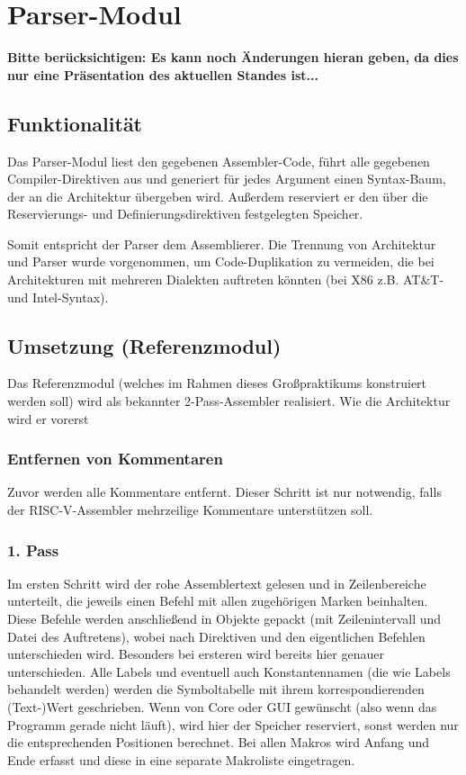 \documentclass[a4paper]{article}
\begin{document}
\section{Parser-Modul}
\textbf{Bitte berücksichtigen: Es kann noch Änderungen hieran geben, da dies nur eine Präsentation des aktuellen Standes ist...}
\subsection{Funktionalität}
Das Parser-Modul liest den gegebenen Assembler-Code,
führt alle gegebenen Compiler-Direktiven aus und generiert für jedes Argument einen Syntax-Baum,
der an die Architektur übergeben wird.
Außerdem reserviert er den über die Reservierungs- und Definierungsdirektiven festgelegten Speicher.

Somit entspricht der Parser dem Assemblierer.
Die Trennung von Architektur und Parser wurde vorgenommen,
um Code-Duplikation zu vermeiden,
die bei Architekturen mit mehreren Dialekten auftreten könnten (bei X86 z.B. AT\&T- und Intel-Syntax).
\subsection{Umsetzung (Referenzmodul)}
Das Referenzmodul (welches im Rahmen dieses Großpraktikums konstruiert werden soll) wird als bekannter 2-Pass-Assembler realisiert. Wie die Architektur wird er vorerst
\subsubsection{Entfernen von Kommentaren}
Zuvor werden alle Kommentare entfernt. Dieser Schritt ist nur notwendig, falls der RISC-V-Assembler mehrzeilige Kommentare unterstützen soll.
\subsubsection{1. Pass}
Im ersten Schritt wird der rohe Assemblertext gelesen und in Zeilenbereiche unterteilt, die jeweils einen Befehl mit allen zugehörigen Marken beinhalten.
Diese Befehle werden anschließend in Objekte gepackt (mit Zeilenintervall und Datei des Auftretens), wobei nach Direktiven und den eigentlichen Befehlen unterschieden wird.
Besonders bei ersteren wird bereits hier genauer unterschieden.
Alle Labels und eventuell auch Konstantennamen (die wie Labels behandelt werden) werden die Symboltabelle mit ihrem korrespondierenden (Text-)Wert geschrieben.
Wenn von Core oder GUI gewünscht (also wenn das Programm gerade nicht läuft), wird hier der Speicher reserviert, sonst werden nur die entsprechenden Positionen berechnet.
Bei allen Makros wird Anfang und Ende erfasst und diese in eine separate Makroliste eingetragen.
\end{document}
